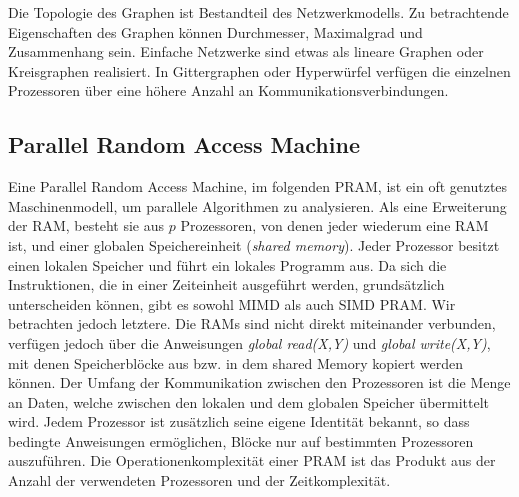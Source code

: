Die Topologie des Graphen ist Bestandteil des Netzwerkmodells.
Zu betrachtende Eigenschaften des Graphen können Durchmesser, Maximalgrad und Zusammenhang sein.
Einfache Netzwerke sind etwas als lineare Graphen oder Kreisgraphen realisiert.
In Gittergraphen oder Hyperwürfel verfügen die einzelnen Prozessoren über eine höhere Anzahl an Kommunikationsverbindungen.
\cite[S.16f.]{jaja}


\subsection{Parallel Random Access Machine}
Eine Parallel Random Access Machine, im folgenden PRAM, ist ein oft genutztes Maschinenmodell, um parallele Algorithmen zu analysieren.
Als eine Erweiterung der RAM, besteht sie aus $p$ Prozessoren, von denen jeder wiederum eine RAM ist, und einer globalen Speichereinheit (\emph{shared memory}).
Jeder Prozessor besitzt einen lokalen Speicher und führt ein lokales Programm aus.
Da sich die Instruktionen, die in einer Zeiteinheit ausgeführt werden, grundsätzlich unterscheiden können, gibt es sowohl MIMD als auch SIMD PRAM.
Wir betrachten jedoch letztere.
Die RAMs sind nicht direkt miteinander verbunden, verfügen jedoch über die Anweisungen \emph{global read(X,Y)} und \emph{global write(X,Y)}, mit denen Speicherblöcke aus bzw. in dem shared Memory kopiert werden können.
Der Umfang der Kommunikation zwischen den Prozessoren ist die Menge an Daten, welche zwischen den lokalen und dem globalen Speicher übermittelt wird.
Jedem Prozessor ist zusätzlich seine eigene Identität bekannt, so dass bedingte Anweisungen ermöglichen, Blöcke nur auf bestimmten Prozessoren auszuführen.
Die Operationenkomplexität einer PRAM ist das Produkt aus der Anzahl der verwendeten Prozessoren und der Zeitkomplexität.
\cite[S.9ff.]{jaja}


